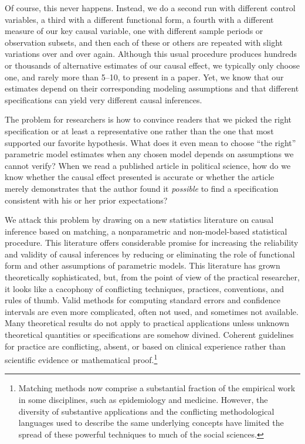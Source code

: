 \documentclass[11pt,titlepage]{article}
\begin{document}
Of course, this never happens.  Instead, we do a second run with
different control variables, a third with a different functional form,
a fourth with a different measure of our key causal variable, one with
different sample periods or observation subsets, and then each of
these or others are repeated with slight variations over and over
again.  Although this usual procedure produces hundreds or thousands
of alternative estimates of our causal effect, we typically only
choose one, and rarely more than 5--10, to present in a paper.  Yet,
we know that our estimates depend on their corresponding modeling
assumptions and that different specifications can yield very different
causal inferences.

The problem for researchers is how to convince readers that we picked
the right specification or at least a representative one rather than
the one that most supported our favorite hypothesis.  What does it
even mean to choose ``the right'' parametric model estimates when any
chosen model depends on assumptions we cannot verify?  When we read a
published article in political science, how do we know whether the
causal effect presented is accurate or whether the article merely
demonstrates that the author found it \emph{possible} to find a
specification consistent with his or her prior expectations?

We attack this problem by drawing on a new statistics literature on
causal inference based on matching, a nonparametric and
non-model-based statistical procedure.  This literature offers
considerable promise for increasing the reliability and validity of
causal inferences by reducing or eliminating the role of functional
form and other assumptions of parametric models.  This literature has
grown theoretically sophisticated, but, from the point of view of the
practical researcher, it looks like a cacophony of conflicting
techniques, practices, conventions, and rules of thumb.  Valid methods
for computing standard errors and confidence intervals are even more
complicated, often not used, and sometimes not available.  Many
theoretical results do not apply to practical applications unless
unknown theoretical quantities or specifications are somehow divined.
Coherent guidelines for practice are conflicting, absent, or based on
clinical experience rather than scientific evidence or mathematical
proof.\footnote{Matching methods now comprise a substantial fraction
  of the empirical work in some disciplines, such as epidemiology and
  medicine.  However, the diversity of substantive applications and
  the conflicting methodological languages used to describe the same
  underlying concepts have limited the spread of these powerful
  techniques to much of the social sciences.}
\end{document}
